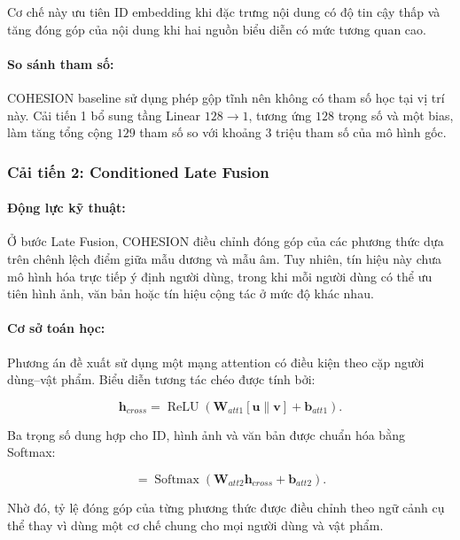 Cơ chế này ưu tiên ID embedding khi đặc trưng nội dung có độ tin cậy thấp và tăng đóng góp của nội dung khi hai nguồn biểu diễn có mức tương quan cao.

\paragraph{So sánh tham số:}
COHESION baseline sử dụng phép gộp tĩnh nên không có tham số học tại vị trí này. Cải tiến 1 bổ sung tầng Linear $128\rightarrow1$, tương ứng $128$ trọng số và một bias, làm tăng tổng cộng $129$ tham số so với khoảng $3$ triệu tham số của mô hình gốc.

\subsubsection{Cải tiến 2: Conditioned Late Fusion}

\paragraph{Động lực kỹ thuật:}
Ở bước Late Fusion, COHESION điều chỉnh đóng góp của các phương thức dựa trên chênh lệch điểm giữa mẫu dương và mẫu âm. Tuy nhiên, tín hiệu này chưa mô hình hóa trực tiếp ý định người dùng, trong khi mỗi người dùng có thể ưu tiên hình ảnh, văn bản hoặc tín hiệu cộng tác ở mức độ khác nhau.

\paragraph{Cơ sở toán học:}
Phương án đề xuất sử dụng một mạng attention có điều kiện theo cặp người dùng--vật phẩm. Biểu diễn tương tác chéo được tính bởi:

\begin{equation}
\mathbf{h}_{cross}
=\operatorname{ReLU}\!\left(
\mathbf{W}_{att1}[\mathbf{u}\parallel\mathbf{v}]+\mathbf{b}_{att1}
\right).
\end{equation}

Ba trọng số dung hợp cho ID, hình ảnh và văn bản được chuẩn hóa bằng Softmax:

\begin{equation}
[\alpha_{id},\alpha_{vis},\alpha_{txt}]
=\operatorname{Softmax}\!\left(
\mathbf{W}_{att2}\mathbf{h}_{cross}+\mathbf{b}_{att2}
\right).
\end{equation}

Nhờ đó, tỷ lệ đóng góp của từng phương thức được điều chỉnh theo ngữ cảnh cụ thể thay vì dùng một cơ chế chung cho mọi người dùng và vật phẩm.

